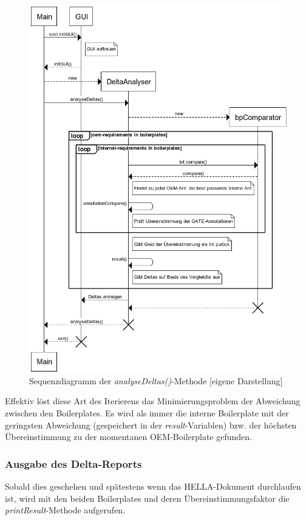 \documentclass[12pt]{report}
\begin{document}
\begin{figure}[h!]
\begin{center}
\includegraphics[scale=0.6]{Bilder/DeltaAnalysis.png}
\caption{Sequenzdiagramm der \textit{analyseDeltas()}-Methode [eigene Darstellung]}
\end{center}
\end{figure}

Effektiv löst diese Art des Iterierens das Minimierungsproblem der Abweichung zwischen den Boilerplates. Es wird als immer die interne Boilerplate mit der geringsten Abweichung (gespeichert in der \textit{result}-Variablen) bzw. der höchsten Übereinstimmung zu der momentanen OEM-Boilerplate gefunden.

\subsubsection{Ausgabe des Delta-Reports}
Sobald dies geschehen und spätestens wenn das HELLA-Dokument durchlaufen ist, wird mit den beiden Boilerplates und deren Übereinstimmungsfaktor die \textit{printResult}-Methode aufgerufen. 
\end{document}
